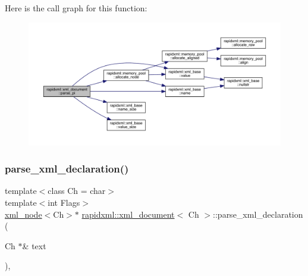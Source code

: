 Here is the call graph for this function\+:\nopagebreak
\begin{figure}[H]
\begin{center}
\leavevmode
\includegraphics[width=350pt]{classrapidxml_1_1xml__document_a09e12a4233a07387d4b5a5ad239388aa_cgraph}
\end{center}
\end{figure}
\mbox{\label{classrapidxml_1_1xml__document_a0151c52c82ba79ea0605c2facf39c534}} 
\subsubsection{\texorpdfstring{parse\_xml\_declaration()}{parse\_xml\_declaration()}}
{\footnotesize\ttfamily template$<$class Ch = char$>$ \\
template$<$int Flags$>$ \\
\mbox{\hyperlink{classrapidxml_1_1xml__node}{xml\+\_\+node}}$<$Ch$>$$\ast$ \mbox{\hyperlink{classrapidxml_1_1xml__document}{rapidxml\+::xml\+\_\+document}}$<$ Ch $>$\+::parse\+\_\+xml\+\_\+declaration (\begin{DoxyParamCaption}\item[{Ch $\ast$\&}]{text }\end{DoxyParamCaption})\hspace{0.3cm}{\ttfamily [inline]}, {\ttfamily [private]}}

